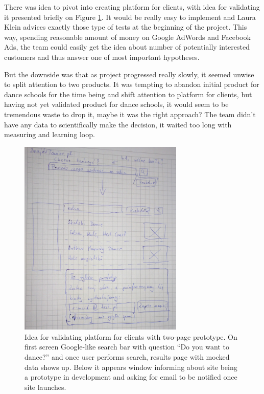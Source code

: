 \documentclass{article}
\begin{document}
There was idea to pivot into creating platform for clients, with idea for validating it presented briefly on Figure \ref{fig:znajdz-taniec}. It would be really easy to implement and Laura Klein \cite{klein2013ux} advices exactly those type of tests at the beginning of the project. This way, spending reasonable amount of money on Google AdWords and Facebook Ads, the team could easily get the idea about number of potentially interested customers and thus answer one of most important hypotheses.

But the downside was that as project progressed really slowly, it seemed unwise to split attention to two products. It was tempting to abandon initial product for dance schools for the time being and shift attention to platform for clients, but having not yet validated product for dance schools, it would seem to be tremendous waste to drop it, maybe it was the right approach? The team didn't have any data to scientifically make the decision, it waited too long with measuring and learning loop.

\begin{figure}[h]
    \centering
    \includegraphics[width=0.7\textwidth]{znajdz-taniec}
    \caption{Idea for validating platform for clients with two-page prototype. On first screen Google-like search bar with question ``Do you want to dance?'' and once user performs search, results page with mocked data shows up. Below it appears window informing about site being a prototype in development and asking for email to be notified once site launches.}
    \label{fig:znajdz-taniec} 
\end{figure}
\end{document}
